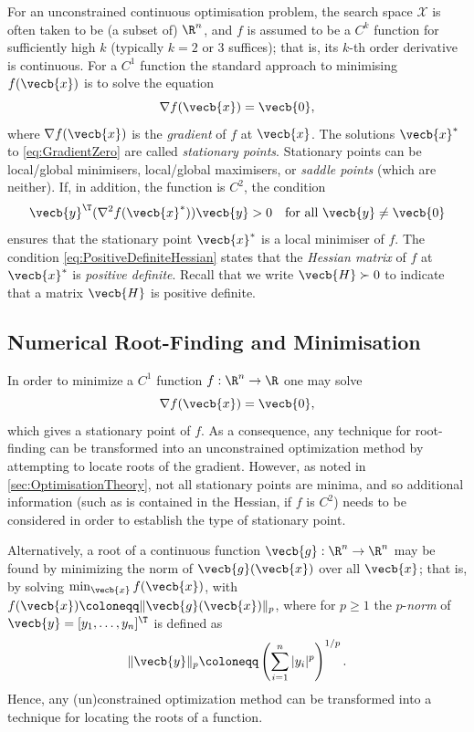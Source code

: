 For an unconstrained continuous optimisation problem, the search space $\mathcal{X}$ is often taken to be (a subset of) $\R^n$, and $f$ is assumed to be a $C^k$ function for sufficiently high $k$ (typically $k=2$ or $3$ suffices); that is, its $k$-th order derivative is continuous. For a $C^1$ function the standard approach to minimising $f(\vecb{x})$ is to solve the equation
\begin{equation}
	\nabla f(\vecb{x}) = \vecb{0}, \label{eq:GradientZero}
\end{equation}
where $\nabla f(\vecb{x})$ is the \textit{gradient} of $f$ at $\vecb{x}$. The solutions $\vecb{x}^*$ to \cref{eq:GradientZero} are called \textit{stationary points}. Stationary points can be local/global minimisers, local/global maximisers, or \textit{saddle points} (which are neither). If, in addition, the function is $C^2$, the condition
\begin{equation}
	\vecb{y}^\T (\nabla^2 f(\vecb{x}^*)) \vecb{y} > 0 \quad \text{for all } \vecb{y} \neq \vecb{0} \label{eq:PositiveDefiniteHessian}
\end{equation}
ensures that the stationary point $\vecb{x}^*$ is a local minimiser of $f$. The condition \cref{eq:PositiveDefiniteHessian} states that the \textit{Hessian matrix} of $f$ at $\vecb{x}^*$ is \textit{positive definite}. Recall that we write $\vecb{H} \succ 0$ to indicate that a matrix $\vecb{H}$ is positive definite.

\subsection{Numerical Root-Finding and Minimisation}
In order to minimize a $C^1$ function $f : \R^n \to \R$ one may solve
\begin{equation*}
	\nabla f(\vecb{x}) = \vecb{0},
\end{equation*}
which gives a stationary point of $f$. As a consequence, any technique for root-finding can be transformed into an unconstrained optimization method by attempting to locate roots of the gradient. However, as noted in \cref{sec:OptimisationTheory}, not all stationary points are minima, and so additional information (such as is contained in the Hessian, if $f$ is $C^2$) needs to be considered in order to establish the type of stationary point.

Alternatively, a root of a continuous function $\vecb{g} : \R^n \to \R^n$ may be found by minimizing the norm of $\vecb{g}(\vecb{x})$ over all $\vecb{x}$; that is, by solving $\min_{\vecb{x}} f(\vecb{x})$, with $f(\vecb{x}) \coloneqq \|\vecb{g}(\vecb{x})\|_p$, where for $p \ge 1$ the $p$-\textit{norm} of $\vecb{y} = [y_1, \dots, y_n]^\T$ is defined as
\begin{equation*}
	\|\vecb{y}\|_p \coloneqq \left( \sum_{i=1}^n |y_i|^p \right)^{1/p}.
\end{equation*}
Hence, any (un)constrained optimization method can be transformed into a technique for locating the roots of a function.

